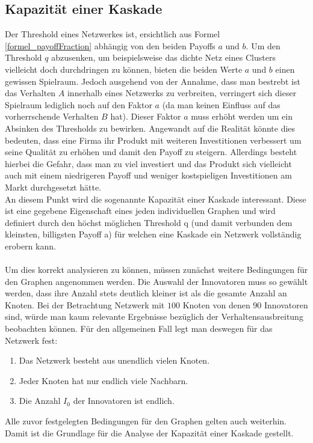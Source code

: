 \documentclass[12pt]{article}
\begin{document}
\subsection{Kapazität einer Kaskade}
Der Threshold eines Netzwerkes ist, ersichtlich aus Formel \ref{formel_payoffFraction} abhängig von den beiden Payoffs $a$ und $b$. Um den Threshold $q$ abzusenken, um beispielsweise das dichte Netz eines Clusters vielleicht doch durchdringen zu können, bieten die beiden Werte $a$ und $b$ einen gewissen Spielraum. Jedoch ausgehend von der Annahme, dass man bestrebt ist das Verhalten $A$ innerhalb eines Netzwerks zu verbreiten, verringert sich dieser Spielraum lediglich noch auf den Faktor $a$ (da man keinen Einfluss auf das vorherrschende Verhalten $B$ hat). Dieser Faktor $a$ muss erhöht werden um ein Absinken des Thresholds zu bewirken. Angewandt auf die Realität könnte dies bedeuten, dass eine Firma ihr Produkt mit weiteren Investitionen verbessert um seine Qualität zu erhöhen und damit den Payoff zu steigern. Allerdings besteht hierbei die Gefahr, dass man zu viel investiert und das Produkt sich vielleicht auch mit einem niedrigeren Payoff und weniger kostspieligen Investitionen am Markt durchgesetzt hätte.\\
An diesem Punkt wird die sogenannte Kapazität einer Kaskade interessant. Diese ist eine gegebene Eigenschaft eines jeden individuellen Graphen und wird definiert durch den höchst möglichen Threshold q (und damit verbunden dem kleinsten, billigsten Payoff a) für welchen eine Kaskade ein Netzwerk vollständig erobern kann.\\\\
Um dies korrekt analysieren zu können, müssen zunächst weitere Bedingungen für den Graphen angenommen werden. Die Auswahl der Innovatoren muss so gewählt werden, dass ihre Anzahl stets deutlich kleiner ist als die gesamte Anzahl an Knoten. Bei der Betrachtung Netzwerk mit $100$ Knoten von denen $90$ Innovatoren sind, würde man kaum relevante Ergebnisse bezüglich der Verhaltensausbreitung beobachten können. Für den allgemeinen Fall legt man deswegen für das Netzwerk fest:
\begin{enumerate}
\item Das Netzwerk besteht aus unendlich vielen Knoten.
\item Jeder Knoten hat nur endlich viele Nachbarn.
\item Die Anzahl $I_0$ der Innovatoren ist endlich.
\end{enumerate}
Alle zuvor festgelegten Bedingungen für den Graphen gelten auch weiterhin. Damit ist die Grundlage für die Analyse der Kapazität einer Kaskade gestellt.
\end{document}
